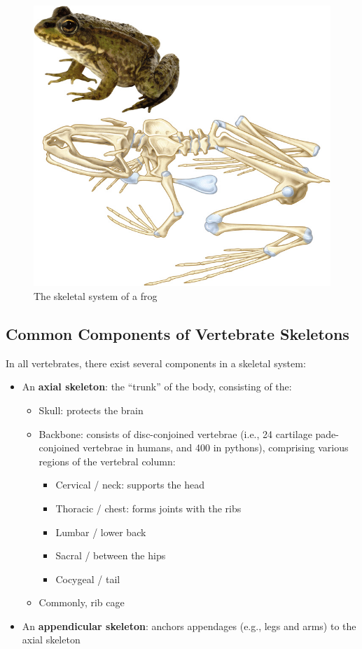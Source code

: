 \documentclass{article}
\begin{document}
\bigbreak{}

\begin{figure}[h]
  \centering
  \includegraphics[width=0.7\linewidth]{frog_skeletal_system.jpg}
  \caption{The skeletal system of a frog}
\end{figure}

\subsection{Common Components of Vertebrate Skeletons}

In all vertebrates, there exist several components in a skeletal system:

\begin{itemize}
    \item An \textbf{axial skeleton}: the ``trunk'' of the body, consisting of
    the:
        \begin{itemize}
            \item Skull: protects the brain
            \item Backbone: consists of disc-conjoined vertebrae (i.e.,
            24 cartilage pade-conjoined vertebrae in humans, and 400 in
            pythons), comprising various regions of the vertebral column:
                \begin{itemize}
                    \item Cervical / neck: supports the head
                    \item Thoracic / chest: forms joints with the ribs
                    \item Lumbar / lower back
                    \item Sacral / between the hips
                    \item Cocygeal / tail
                \end{itemize}
            \item Commonly, rib cage
        \end{itemize}
  \item An \textbf{appendicular skeleton}: anchors appendages (e.g., legs and
    arms) to the axial skeleton
\end{itemize}
\end{document}
